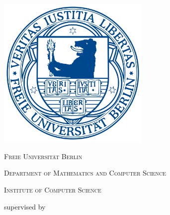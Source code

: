
\thispagestyle{empty}
\hypersetup{pageanchor=false}
\begin{titlepage}
	\centering
	\vspace{2cm}
	{\textbf{\@subject}}
	\vspace{0.5cm}

	{\textbf{\huge \@title}}
    
	{\large \@author}
	\vspace{0.5cm}

	\includegraphics[width=0.55\textwidth]{images/2000px-Fub_siegel.png}

	{\scshape\LARGE Freie Universität Berlin}
    
	{\scshape\large Department of Mathematics and Computer Science}
    
	\vspace{-0.4cm}
	{\scshape\large Institute of Computer Science}
	\vspace{0.5cm}

    

    \vspace{1.8cm}

	supervised by
    
    \vspace{-0.4cm}
	\mysupervisor
	\vfill

	{\large \@date}

\hypersetup{pageanchor=true}
\end{titlepage}

